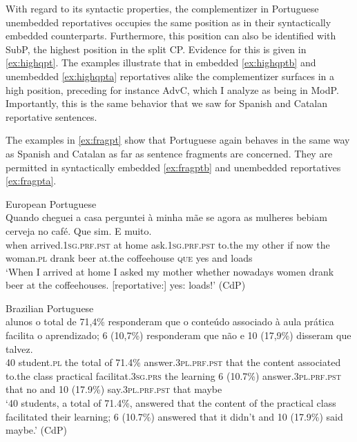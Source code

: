 With regard to its syntactic properties, the complementizer in Portuguese unembedded reportatives occupies the same position as in their syntactically embedded counterparts. Furthermore, this position can also be identified with SubP, the highest position in the split CP. Evidence for this is given in \eqref{ex:highqpt}. The examples illustrate that in embedded \eqref{ex:highqptb} and unembedded \eqref{ex:highqpta} reportatives alike the complementizer surfaces in a high position, preceding for instance AdvC, which I analyze as being in ModP. Importantly,  this is the same behavior that we saw for  Spanish and Catalan reportative sentences.






The examples in \eqref{ex:fragpt} show that   Portuguese again behaves in the same way as Spanish and Catalan as far as sentence fragments are concerned. They are permitted in syntactically embedded \eqref{ex:fragptb} and unembedded reportatives \eqref{ex:fragpta}. 

\ea\label{ex:fragpt}
\ea\label{ex:fragpta}
 European Portuguese \\
 \gll
Quando cheguei a casa perguntei à minha mãe se agora as mulheres bebiam cerveja no café. Que sim. E muito. \\
when arrived.\textsc{1sg.prf.pst} at home ask.\textsc{1sg.prf.pst} to.the my other if now the woman.\textsc{pl} drank beer at.the coffeehouse \textsc{que} yes and loads\\
\glt `When I arrived at home I asked my mother whether nowadays women drank beer at the coffeehouses. [reportative:] yes: loads!' (CdP)

\ex\label{ex:fragptb}
 Brazilian Portuguese \\
 alunos o total de 71,4\% responderam que o conteúdo associado à aula prática facilita o aprendizado; 6 (10,7\%) responderam que não e 10 (17,9\%) disseram que talvez.  \\
40 student.\textsc{pl} the total of 71.4\% answer.\textsc{3pl.prf.pst} that the content associated to.the class practical facilitat.\textsc{3sg.prs} the learning 6 (10.7\%) answer.\textsc{3pl.prf.pst} that no and 10 (17.9\%) say.\textsc{3pl.prf.pst} that maybe\\
\glt `40 students, a total of 71.4\%, answered that the content of the practical class facilitated their  learning; 6 (10.7\%) answered that it didn't and 10 (17.9\%) said maybe.' (CdP)
\z
 \z


\pagebreak

